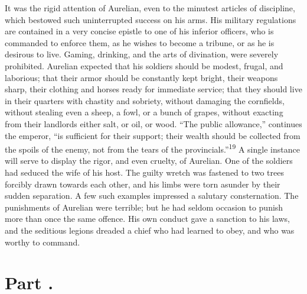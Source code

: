 It was the rigid attention of Aurelian, even to the minutest
articles of discipline, which bestowed such uninterrupted success
on his arms. His military regulations are contained in a very
concise epistle to one of his inferior officers, who is commanded
to enforce them, as he wishes to become a tribune, or as he is
desirous to live. Gaming, drinking, and the arts of divination,
were severely prohibited. Aurelian expected that his soldiers
should be modest, frugal, and laborious; that their armor should
be constantly kept bright, their weapons sharp, their clothing
and horses ready for immediate service; that they should live in
their quarters with chastity and sobriety, without damaging the
cornfields, without stealing even a sheep, a fowl, or a bunch of
grapes, without exacting from their landlords either salt, or
oil, or wood. “The public allowance,” continues the emperor, “is
sufficient for their support; their wealth should be collected
from the spoils of the enemy, not from the tears of the
provincials.”\textsuperscript{19} A single instance will serve to display the
rigor, and even cruelty, of Aurelian. One of the soldiers had
seduced the wife of his host. The guilty wretch was fastened to
two trees forcibly drawn towards each other, and his limbs were
torn asunder by their sudden separation. A few such examples
impressed a salutary consternation. The punishments of Aurelian
were terrible; but he had seldom occasion to punish more than
once the same offence. His own conduct gave a sanction to his
laws, and the seditious legions dreaded a chief who had learned
to obey, and who was worthy to command.


\section{Part \thesection.}

